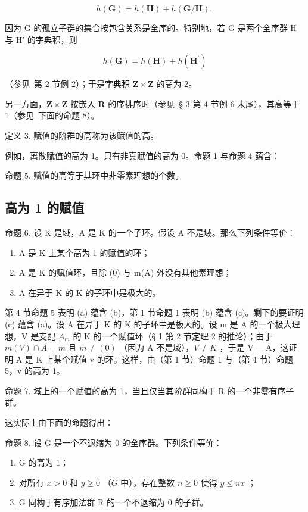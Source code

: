 \[
h (\mathbf {G}) = h (\mathbf {H}) + h (\mathbf {G} / \mathbf {H}),\tag{2}
\]

因为 G 的孤立子群的集合按包含关系是全序的。特别地，若 G 是两个全序群 H 与 H' 的字典积，则

\[
h (\mathbf {G}) = h (\mathbf {H}) + h \left(\mathbf {H} ^ {\prime}\right)\tag{3}
\]

（参见~第 2 节例 2）；于是字典积 \(\mathbf{Z} \times \mathbf{Z}\) 的高为 2。

另一方面，\(\mathbf{Z} \times \mathbf{Z}\) 按嵌入 \(\mathbf{R}\) 的序排序时（参见~§ 3 第 4 节例 6 末尾），其高等于 1（参见~下面的命题 8）。

定义 3. 赋值的阶群的高称为该赋值的高。

例如，离散赋值的高为 1。只有非真赋值的高为 0。命题 1 与命题 4 蕴含：

命题 5. 赋值的高等于其环中非零素理想的个数。

\subsection{高为 1 的赋值}

命题 6. 设 K 是域，A 是 K 的一个子环。假设 A 不是域。那么下列条件等价：

\begin{enumerate}
\def\labelenumi{(\alph{enumi})}
\item
  A 是 K 上某个高为 1 的赋值的环；
\item
  A 是 K 的赋值环，且除 (0) 与 m(A) 外没有其他素理想；
\item
  A 在异于 K 的 K 的子环中是极大的。
\end{enumerate}

第 4 节命题 5 表明 (a) 蕴含 (b)，第 1 节命题 1 表明 (b) 蕴含 (c)。剩下的要证明 (c) 蕴含 (a)。设 A 在异于 K 的 K 的子环中是极大的。设 m 是 A 的一个极大理想，V 是支配 \(A_{m}\) 的 K 的一个赋值环（§ 1 第 2 节定理 2 的推论）；由于 \(m(V) \cap A = m\) 且 \(m \neq (0)\) （因为 A 不是域），\(V \neq K\) ，于是 V = A，这证明 A 是 K 上某个赋值 v 的环。这样，由（第 1 节）命题 1 与（第 4 节）命题 5，v 的高为 1。

命题 7. 域上的一个赋值的高为 1，当且仅当其阶群同构于 R 的一个非零有序子群。

这实际上由下面的命题得出：

命题 8. 设 G 是一个不退缩为 0 的全序群。下列条件等价：

\begin{enumerate}
\def\labelenumi{(\alph{enumi})}
\item
  G 的高为 1；
\item
  对所有 \(x > 0\) 和 \(y \geqslant 0\) （\(G\) 中），存在整数 \(n \geqslant 0\) 使得 \(y \leqslant nx\) ；
\item
  G 同构于有序加法群 R 的一个不退缩为 0 的子群。
\end{enumerate}

